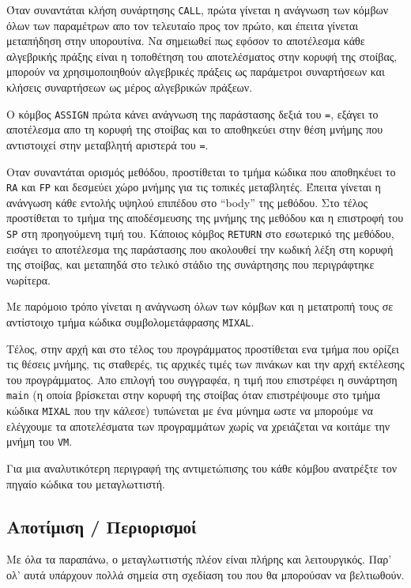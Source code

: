 \documentclass[a4paper,11pt]{article}
\newcommand{\eng}[1]{\foreignlanguage{english}{#1}}
\newcommand{\tech}[1]{\foreignlanguage{english}{\texttt{#1}}}
\begin{document}
Όταν συναντάται κλήση συνάρτησης \tech{CALL}, πρώτα γίνεται η ανάγνωση των κόμβων 
όλων των παραμέτρων απο τον τελευταίο προς τον πρώτο, και έπειτα γίνεται μεταπήδηση 
στην υπορουτίνα. Να σημειωθεί πως εφόσον το αποτέλεσμα κάθε αλγεβρικής πράξης είναι
η τοποθέτηση του αποτελέσματος στην κορυφή της στοίβας, μπορούν να χρησιμοποιηθούν
αλγεβρικές πράξεις ως παράμετροι συναρτήσεων και κλήσεις συναρτήσεων ως μέρος αλγεβρικών
πράξεων.

Ο κόμβος \tech{ASSIGN} πρώτα κάνει ανάγνωση της παράστασης δεξιά του \tech{=}, εξάγει
το αποτέλεσμα απο τη κορυφή της στοίβας και το αποθηκεύει στην θέση μνήμης που αντιστοιχεί
στην μεταβλητή αριστερά του \tech{=}.

Οταν συναντάται ορισμός μεθόδου, προστίθεται το τμήμα κώδικα που αποθηκέυει το \tech{RA}
και \tech{FP} και δεσμεύει χώρο μνήμης για τις τοπικές μεταβλητές. Έπειτα γίνεται
η ανάνγωση κάθε εντολής υψηλού επιπέδου στο \enquote{\eng{body}} της μεθόδου. Στο τέλος
προστίθεται το τμήμα της αποδέσμευσης της μνήμης της μεθόδου και η επιστροφή του \tech{SP}
στη προηγούμενη τιμή του. Κάποιος κόμβος \tech{RETURN} στο εσωτερικό της μεθόδου, εισάγει
το αποτέλεσμα της παράστασης που ακολουθεί την κωδική λέξη στη κορυφή της στοίβας, και
μεταπηδά στο τελικό στάδιο της συνάρτησης που περιγράφτηκε νωρίτερα.

Με παρόμοιο τρόπο γίνεται η ανάγνωση όλων των κόμβων και η μετατροπή τους σε αντίστοιχο
τμήμα κώδικα συμβολομετάφρασης \tech{MIXAL}.

Τέλος, στην αρχή και στο τέλος του προγράμματος προστίθεται ενα τμήμα που ορίζει τις θέσεις
μνήμης, τις σταθερές, τις αρχικές τιμές των πινάκων και την αρχή εκτέλεσης του προγράμματος.
Απο επιλογή του συγγραφέα, η τιμή που επιστρέφει η συνάρτηση \tech{main} (η οποία βρίσκεται
στην κορυφή της στοίβας όταν επιστρέψουμε στο τμήμα κώδικα \tech{MIXAL} που την κάλεσε)
τυπώνεται με ένα μύνημα ωστε να μπορούμε να ελέγχουμε τα αποτελέσματα των προγραμμάτων
χωρίς να χρειάζεται να κοιτάμε την μνήμη του \tech{VM}.

Για μια αναλυτικότερη περιγραφή της αντιμετώπισης του κάθε κόμβου ανατρέξτε τον πηγαίο
κώδικα του μεταγλωττιστή.

\subsection{Αποτίμιση / Περιορισμοί}
Με όλα τα παραπάνω, ο μεταγλωττιστής πλέον είναι πλήρης και λειτουργικός. Παρ' ολ' αυτά
υπάρχουν πολλά σημεία στη σχεδίαση του που θα μπορούσαν να βελτιωθούν.
\end{document}
